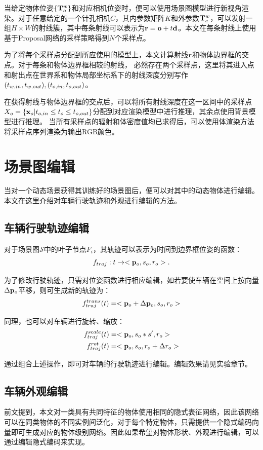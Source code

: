 当给定物体位姿$\{\mathbf{T}_o^w\}$和对应相机位姿时，便可以使用场景图模型进行新视角渲染。对于任意给定的一个针孔相机$C$，其内参数矩阵$K$和外参数$\mathbf{T}_c^w$，可以发射一组$H\times W$的射线簇，其中每条射线可以表示为${\mathbf{r}} = \mathbf{o} + t{\mathbf{d}}$。本文在每条射线上使用基于Proposal网络的采样策略得到$N$个采样点。

为了将每个采样点分配到所应使用的模型上，本文计算射线${\mathbf{r}}$和物体边界框的交点。对于每条和物体边界框相较的射线， 必然存在两个采样点，这里将其进入点和射出点在世界系和物体局部坐标系下的射线深度分别写作$({t_{w, in}}, {t_{w, out}}), ({t_{o, in}}, {t_{o, out}})$。

在获得射线与物体边界框的交点后，可以将所有射线深度在这一区间中的采样点$X_o =\{{{\mathbf{x}}_o} |{t_{o, in}} \leq t_{o} \leq {t_{o, out}}\}$分配到对应渲染模型中进行推理，其余点使用背景模型进行推理。
当所有采样点的辐射和体密度值均已求得后，可以使用体渲染方法将采样点序列渲染为输出RGB颜色。

\section{场景图编辑}

当对一个动态场景获得其训练好的场景图后，便可以对其中的动态物体进行编辑。本文在这里介绍对车辆行驶轨迹和外观进行编辑的方法。

\subsection{车辆行驶轨迹编辑}
对于场景图$\mathcal{S}$中的叶子节点$F_i$，其轨迹可以表示为时间到边界框位姿的函数：
\begin{equation}
    f_{traj}: \quad t\to<\po, s_o, r_o>.
\end{equation}

为了修改行驶轨迹，只需对位姿函数进行相应编辑，如若要使车辆在空间上按向量$\Delta{\mathbf{p}_o}$平移，则可生成新的轨迹为：
\begin{equation}
    f_{traj}^{trans}(t) = <{\mathbf{p}_o} + \Delta{\mathbf{p}_o}, s_o, r_o>
\end{equation}

同理，也可以对车辆进行旋转、缩放：
\begin{align}
    f_{traj}^{scale}(t) &= <{\mathbf{p}_o}, s_o * s', r_o>\\
    f_{traj}^{rot}(t) &= <{\mathbf{p}_o}, s_o, r_o + \Delta r_o>
\end{align}

通过组合上述操作，即可对车辆的行驶轨迹进行编辑。编辑效果请见实验章节。

\subsection{车辆外观编辑}
前文提到，本文对一类具有共同特征的物体使用相同的隐式表征网络，因此该网络可以在同类物体的不同实例间泛化，对于每个特定物体，只需提供一个隐式编码向量即可生成对应的物体级别网络。因此如果希望对物体形状、外观进行编辑，可以通过编辑隐式编码来实现。

